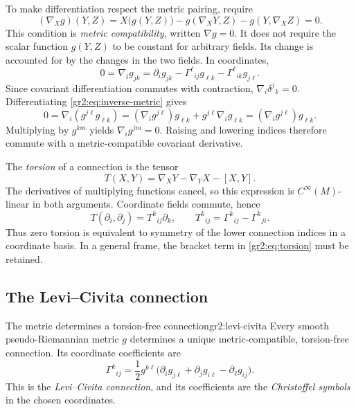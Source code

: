 \documentclass[11pt,a4paper]{article}
\numberwithin{equation}{section}
\newcommand{\Cinf}{C^\infty}
\newcommand{\slideref}[1]{\par\nobreak\smallskip\nobreak{\footnotesize\color{ink!60}\textsc{Source slide #1}}\par\nobreak\smallskip\nobreak}
\begin{document}
To make differentiation respect the metric pairing, require
\begin{equation}
 (\nabla_Xg)(Y,Z)
 =X\bigl(g(Y,Z)\bigr)
  -g(\nabla_XY,Z)-g(Y,\nabla_XZ)=0.
 \label{gr2:eq:metric-compatibility}
\end{equation}
This condition is \emph{metric compatibility}, written \(\nabla g=0\).
It does not require the scalar function \(g(Y,Z)\) to be constant for
arbitrary fields. Its change is accounted for by the changes in the two
fields. In coordinates,
\begin{equation}
 0=\nabla_i g_{jk}
 =\partial_i g_{jk}-\Gamma^\ell{}_{ij}g_{\ell k}
                         -\Gamma^\ell{}_{ik}g_{j\ell}.
 \label{gr2:eq:compatibility-components}
\end{equation}
Since covariant differentiation commutes with contraction,
\(\nabla_i\delta^j{}_k=0\). Differentiating
\eqref{gr2:eq:inverse-metric} gives
\[
 0=\nabla_i(g^{j\ell}g_{\ell k})
  =(\nabla_i g^{j\ell})g_{\ell k}
    +g^{j\ell}\nabla_i g_{\ell k}
  =(\nabla_i g^{j\ell})g_{\ell k}.
\]
Multiplying by \(g^{km}\) yields \(\nabla_i g^{jm}=0\).
Raising and lowering indices therefore commute with a metric-compatible
covariant derivative.

The \emph{torsion} of a connection is the tensor
\begin{equation}
 T(X,Y)=\nabla_XY-\nabla_YX-[X,Y].
 \label{gr2:eq:torsion}
\end{equation}
The derivatives of multiplying functions cancel, so this expression is
\(\Cinf(M)\)-linear in both arguments. Coordinate fields commute, hence
\[
 T(\partial_i,\partial_j)=T^k{}_{ij}\partial_k,
 \qquad T^k{}_{ij}=\Gamma^k{}_{ij}-\Gamma^k{}_{ji}.
\]
Thus zero torsion is equivalent to symmetry of the lower connection
indices in a coordinate basis. In a general frame, the bracket term in
\eqref{gr2:eq:torsion} must be retained.

\subsection{The Levi--Civita connection}
\slideref{7}

\begin{theorem}{The metric determines a torsion-free connection}{gr2:levi-civita}
Every smooth pseudo-Riemannian metric \(g\) determines a unique
metric-compatible, torsion-free connection. Its coordinate coefficients
are
\begin{equation}
 \Gamma^k{}_{ij}
 =\frac12g^{k\ell}
  \bigl(\partial_i g_{j\ell}+\partial_j g_{i\ell}
                         -\partial_\ell g_{ij}\bigr).
 \label{gr2:eq:christoffel}
\end{equation}
This is the \emph{Levi--Civita connection}, and its coefficients are
the \emph{Christoffel symbols} in the chosen coordinates.
\end{theorem}
\end{document}
